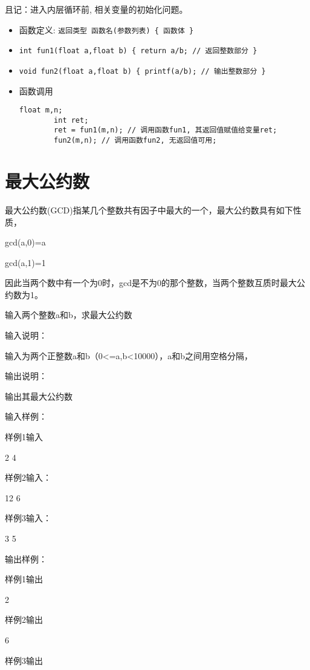 \begin{note}[特别注意]
	且记：进入内层循环前, 相关变量的初始化问题。	
\end{note}

\begin{note}[函数定义和调用]
	\begin{itemize}
		\item 函数定义: \lstinline|返回类型 函数名(参数列表) { 函数体 }|
		\item \lstinline|int fun1(float a,float b) { return a/b; // 返回整数部分 }| 
		\item \lstinline|void fun2(float a,float b) { printf(a/b); // 输出整数部分 }| 
		\item 函数调用
		\begin{lstlisting}[frame=none]
		float m,n;
		int ret;
		ret = fun1(m,n); // 调用函数fun1, 其返回值赋值给变量ret;
		fun2(m,n); // 调用函数fun2, 无返回值可用;
		\end{lstlisting}
	\end{itemize}	
\end{note}


\section{最大公约数}	
最大公约数(GCD)指某几个整数共有因子中最大的一个，最大公约数具有如下性质，

gcd(a,0)=a

gcd(a,1)=1

因此当两个数中有一个为0时，gcd是不为0的那个整数，当两个整数互质时最大公约数为1。

输入两个整数a和b，求最大公约数

输入说明：

输入为两个正整数a和b（0<=a,b<10000），a和b之间用空格分隔，

输出说明：

输出其最大公约数

输入样例：

样例1输入
	
2 4

样例2输入：

12 6

样例3输入：

3 5

输出样例：

样例1输出
	
2

样例2输出

6

样例3输出

